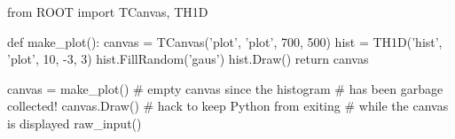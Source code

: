 \begin{footnotesize}
\begin{pyglist}[language=python,texcl=true,abovecaptionskip=0,style=vs,bgcolor=Moccasin]
from ROOT import TCanvas, TH1D

def make_plot():
    canvas = TCanvas('plot', 'plot',
                     700, 500)
    hist = TH1D('hist', 'plot',
                10, -3, 3)
    hist.FillRandom('gaus')
    hist.Draw()
    return canvas

canvas = make_plot()
# empty canvas since the histogram
# has been garbage collected!
canvas.Draw()
# hack to keep Python from exiting
# while the canvas is displayed
raw_input()
\end{pyglist}
\end{footnotesize}
